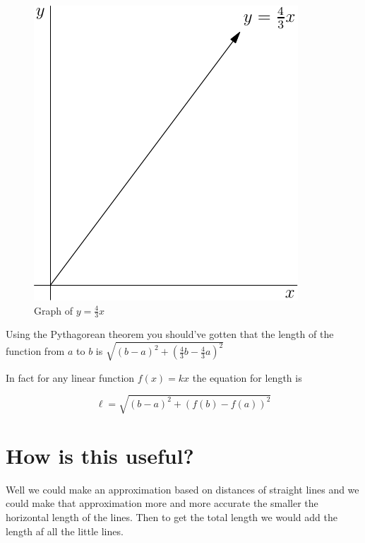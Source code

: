 \documentclass[12pt]{book}
\begin{document}
\begin{figure}[h]
    \centering
    
    \includegraphics[width=\textwidth]{./figures/2.1.pdf}
    
    \caption{Graph of $y = \frac{4}{3}x$}
\end{figure}

Using the Pythagorean theorem you should've gotten that the length of the function from $a$ to  $b$ is $\sqrt{(b-a)^2 + (\frac{4}{3}b - \frac{4}{3}a)^2}$

In fact for any linear function $f(x) = kx$ the equation for length is

$$\ell = \sqrt{(b-a)^2 + (f(b) - f(a))^2}$$

\section{How is this useful?}
Well we could make an approximation based on distances of straight lines and we could make that approximation more and more accurate the smaller the horizontal length of the lines. Then to get the total length we would add the length af all the little lines.

\clearpage
\end{document}
